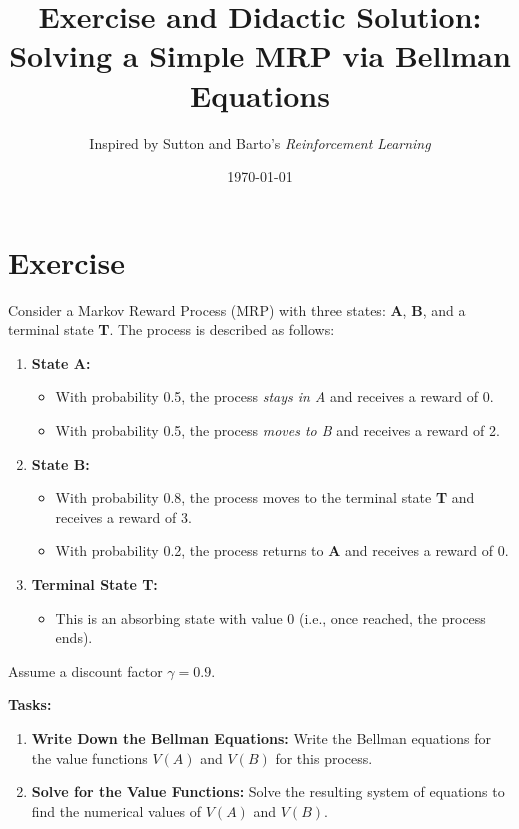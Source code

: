\documentclass[11pt]{article}
\title{Exercise and Didactic Solution: Solving a Simple MRP via Bellman Equations}
\author{Inspired by Sutton and Barto's \emph{Reinforcement Learning}}
\date{\today}
\begin{document}
\maketitle

\section*{Exercise}

Consider a Markov Reward Process (MRP) with three states: \textbf{A}, \textbf{B}, and a terminal state \textbf{T}. The process is described as follows:

\begin{enumerate}[label=\textbf{\arabic*.}]
    \item \textbf{State A:}
    \begin{itemize}
        \item With probability 0.5, the process \emph{stays in A} and receives a reward of 0.
        \item With probability 0.5, the process \emph{moves to B} and receives a reward of 2.
    \end{itemize}
    
    \item \textbf{State B:}
    \begin{itemize}
        \item With probability 0.8, the process moves to the terminal state \textbf{T} and receives a reward of 3.
        \item With probability 0.2, the process returns to \textbf{A} and receives a reward of 0.
    \end{itemize}
    
    \item \textbf{Terminal State T:}  
    \begin{itemize}
        \item This is an absorbing state with value 0 (i.e., once reached, the process ends).
    \end{itemize}
\end{enumerate}

Assume a discount factor \( \gamma = 0.9 \).

\textbf{Tasks:}
\begin{enumerate}[label=\arabic*.]
    \item \textbf{Write Down the Bellman Equations:} Write the Bellman equations for the value functions \( V(A) \) and \( V(B) \) for this process.
    \item \textbf{Solve for the Value Functions:} Solve the resulting system of equations to find the numerical values of \( V(A) \) and \( V(B) \).
\end{enumerate}
\end{document}
